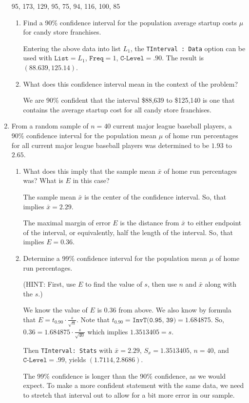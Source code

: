 \documentclass{article}
\newcommand{\answer}[1]{\color{white}#1}
\begin{document}
\begin{enumerate}
\begin{center}
95, 173, 129, 95, 75, 94, 116, 100, 85
\end{center}

	\begin{enumerate}
	\item Find a 90\% confidence interval for the population average startup costs $\mu$ for candy store franchises. 
	
	{\answer Entering the above data into list $L_1$, the \texttt{TInterval : Data} option can be used with 
	$\texttt{List} = L_1$, $\texttt{Freq} = 1$, $\texttt{C-Level} = .90$.  The result is $(88.639, 125.14)$.
	} 
	
	\item What does this confidence interval mean in the context of the problem? 
	
	{\answer We are 90\% confident that the interval \$88,639 to \$125,140 is one that contains the average startup cost for all candy store franchises.
	} 
	\end{enumerate}
	
\item From a random sample of $n=40$ current major league baseball players, a 90\% confidence interval for the population mean $\mu$ of home run percentages for all current major league baseball players was determined to be $1.93$ to $2.65$.

	\begin{enumerate}
	\item What does this imply that the sample mean $\bar x$ of home run percentages was?  What is $E$ in this case? 
	
	{\answer The sample mean $\bar{x}$ is the center of the confidence interval.  So, that implies $\bar{x} = 2.29$. 
	
	The maximal margin of error $E$ is the distance from $\bar{x}$ to either endpoint of the interval, or equivalently, half the length of the interval.  So, that implies $E = 0.36$.
	} 
	
	\item Determine a 99\% confidence interval for the population mean $\mu$ of home run percentages.  
	
	(HINT: First, use $E$ to find the value of $s$, then use $n$ and $\bar{x}$ along with the $s$.) 
	
	{\answer We know the value of $E$ is $0.36$ from above.  We also know by formula that $E = t_{0.90} \cdot \frac{s}{\sqrt{n}}$.  Note that $t_{0.90} = \texttt{InvT(0.95, 39)} = 1.684875$.  So,
	$0.36 = 1.684875 \cdot \frac{s}{\sqrt{40}} $ which implies $1.3513405  = s$. 
	
	Then \texttt{TInterval: Stats} with $\bar{x} = 2.29$, $S_x = 1.3513405$, $n = 40$, and $\texttt{C-Level} = .99$, yields $(1.7114, 2.8686)$. 
	
	The 99\% confidence is longer than the 90\% confidence, as we would expect.  To make a more confident statement with the same data, we need to stretch that interval out to allow for a bit more error in our sample.
	} 
	\end{enumerate}
	
\end{enumerate}

\vfill
\end{document}
